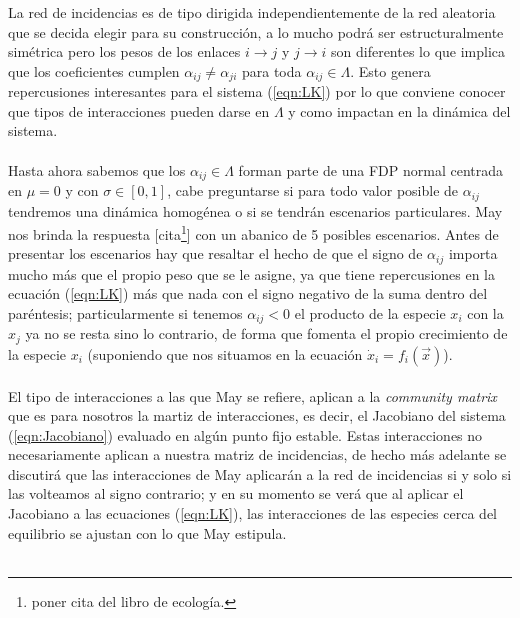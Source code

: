 La red de incidencias es de tipo dirigida independientemente de la red aleatoria que se decida elegir para su construcción, a lo mucho podrá ser estructuralmente simétrica pero los pesos de los enlaces $i\to j$ y $j\to i$ son diferentes lo que implica que los coeficientes cumplen $\alpha_{ij}\neq\alpha_{ji}$ para toda $\alpha_{ij}\in\Lambda$. Esto genera repercusiones interesantes para el sistema (\ref{eqn:LK}) por lo que conviene conocer que tipos de interacciones pueden darse en $\Lambda$ y como impactan en la dinámica del sistema.\\
\\
Hasta ahora sabemos que los $\alpha_{ij}\in\Lambda$ forman parte de una FDP normal centrada en $\mu=0$ y con $\sigma\in[0,1]$, cabe preguntarse si para todo valor posible de $\alpha_{ij}$ tendremos una dinámica homogénea o si se tendrán escenarios particulares. May nos brinda la respuesta [cita\footnote{poner cita  del libro de ecología.}] con un abanico de 5 posibles escenarios. Antes de presentar los escenarios hay que resaltar el hecho de que el signo de $\alpha_{ij}$ importa mucho más que el propio peso que se le asigne, ya que tiene repercusiones en la ecuación (\ref{eqn:LK}) más que nada con el signo negativo de la suma dentro del paréntesis; particularmente si tenemos $\alpha_{ij}<0$ el producto de la especie $x_i$ con la $x_j$ ya no se resta sino lo contrario, de forma que fomenta el propio crecimiento de la especie $x_i$ (suponiendo que nos situamos en la ecuación $\dot{x}_i=f_i(\vec{x})$).\\
\\
El tipo de interacciones a las que May se refiere, aplican a la \textit{community matrix} que es para nosotros la martiz de interacciones, es decir, el Jacobiano del sistema (\ref{eqn:Jacobiano}) evaluado en algún punto fijo estable. Estas interacciones no necesariamente aplican a nuestra matriz de incidencias, de hecho más adelante se discutirá que las interacciones de May aplicarán a la red de incidencias si y solo si las volteamos al signo contrario; y en su momento se verá que al aplicar el Jacobiano a las ecuaciones (\ref{eqn:LK}), las interacciones de las especies cerca del equilibrio se ajustan con lo que May estipula.\\
\\
